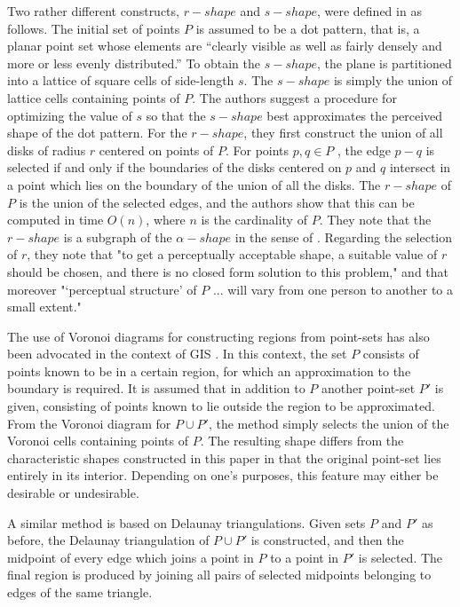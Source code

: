 \documentclass[preprint,5p,times,twocolumn]{elsarticle}
\begin{document}
Two rather different constructs, $r-shape$ and $s-shape$, were defined in \cite{Chaudhuri:1997:NAC:269777.269779} as follows. The initial set of points $P$ is assumed to be a dot pattern, that is, a planar point set whose elements are “clearly visible as well as fairly densely and more or less evenly distributed.” To obtain the $s-shape$, the plane is partitioned into a lattice of square cells of side-length $s$. The $s-shape$ is simply the union of lattice cells containing points of $P$. The authors suggest a procedure for optimizing the value of $s$ so that the $s-shape$ best approximates the perceived shape of the dot pattern. For the $r-shape$, they first construct the union of all disks of radius $r$ centered on points of $P$. For points $p, q \in P$ , the edge $p-q$ is selected if and only if the boundaries of the disks centered on $p$ and $q$ intersect in a point which lies on the boundary of the union of all the disks. The $r-shape$ of $P$ is the union of the selected edges, and the authors show that this can be computed in time $O(n)$, where $n$ is the cardinality of $P$. They note that the $r-shape$ is a subgraph of the $\alpha-shape$ in the sense of \cite{Edelsbrunner:2006:SSP:2263365.2270180}. Regarding the selection of $r$, they note that "to get a perceptually acceptable shape, a suitable value of $r$ should be chosen, and there is no closed form solution to this problem," and that moreover "‘perceptual structure’ of $P$ ... will vary from one person to another to a small extent."

The use of Voronoi diagrams for constructing regions from point-sets has also been advocated in the context of GIS \cite{Harith01}. In this context, the set $P$ consists of points known to be in a certain region, for which an approximation to the boundary is required. It is assumed that in addition to $P$ another point-set $P'$ is given, consisting of points known to lie outside the region to be approximated. From the Voronoi diagram for $P \cup P'$, the method simply selects the union of the Voronoi cells containing points of $P$. The resulting shape differs from the characteristic shapes constructed in this paper in that the original point-set lies entirely in its interior. Depending on one’s purposes,
this feature may either be desirable or undesirable. 


A similar method \cite{Avi-04} is based on Delaunay triangulations. Given sets $P$ and $P'$ as before, the Delaunay triangulation of $P \cup P'$ is constructed, and then the midpoint of every edge which joins a point in $P$ to a point in $P'$ is selected. The final region is produced by joining all pairs of selected midpoints belonging to edges of the same triangle.
\end{document}
